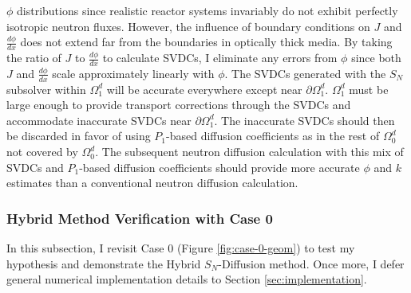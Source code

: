 $\phi$ distributions since realistic reactor systems invariably do not exhibit perfectly isotropic
neutron fluxes. However, the influence of boundary conditions on $J$ and $\frac{d\phi}{dx}$ does
not extend far from the boundaries in optically thick media. By taking the ratio of $J$
to $\frac{d\phi}{dx}$ to calculate \glspl{SVDC}, I eliminate any errors from $\phi$ since both
$J$ and $\frac{d\phi}{dx}$ scale approximately linearly with $\phi$. The \glspl{SVDC}
generated with the $S_N$ subsolver within $\Omega^d_1$ will be accurate everywhere except near
$\partial\Omega^d_1$. $\Omega^d_1$ must be large enough to provide transport corrections
through the \glspl{SVDC} and accommodate inaccurate \glspl{SVDC} near
$\partial\Omega^d_1$. The inaccurate \glspl{SVDC} should then be discarded in favor of using
$P_1$-based diffusion coefficients as in the rest of $\Omega^d_0$ not covered by $\Omega^d_0$. The
subsequent neutron diffusion calculation with this mix of \glspl{SVDC} and $P_1$-based diffusion
coefficients should provide more accurate $\phi$ and $k$ estimates than a conventional
neutron diffusion calculation.


\subsubsection{Hybrid Method Verification with Case 0}

In this subsection, I revisit Case 0
(Figure \ref{fig:case-0-geom}) to test my hypothesis and demonstrate the Hybrid $S_N$-Diffusion
method. Once more, I defer general numerical implementation details to
Section \ref{sec:implementation}.

